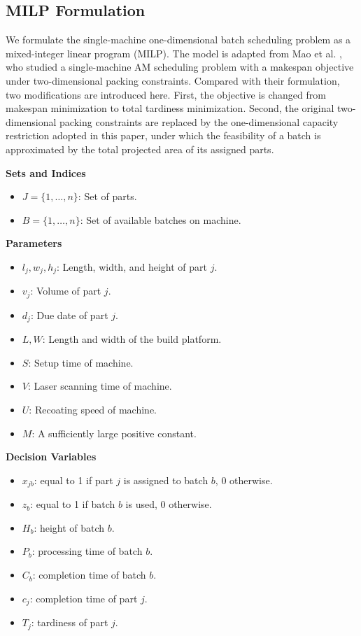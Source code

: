 \documentclass[letterpaper, 10 pt, conference]{ieeeconf}  %
\begin{document}
\subsection{MILP Formulation}
We formulate the single-machine one-dimensional batch scheduling problem as a mixed-integer linear program (MILP). The model is adapted from Mao et al. \cite{maoCombinatorialBendersDecomposition2024}, who studied a single-machine AM scheduling problem with a makespan objective under two-dimensional packing constraints. Compared with their formulation, two modifications are introduced here. First, the objective is changed from makespan minimization to total tardiness minimization. Second, the original two-dimensional packing constraints are replaced by the one-dimensional capacity restriction adopted in this paper, under which the feasibility of a batch is approximated by the total projected area of its assigned parts. 

\noindent \textbf{Sets and Indices}
\begin{itemize}
    \item $J = \{1, \dots, n\}$: Set of parts.
    \item $B = \{1, \dots, n\}$: Set of available batches on machine.
\end{itemize}

\noindent \textbf{Parameters}
\begin{itemize}
    \item $l_j, w_j, h_j$: Length, width, and height of part $j$.
    \item $v_j$: Volume of part $j$.
    \item $d_j$: Due date of part $j$.
    \item $L, W$: Length and width of the build platform.
    \item $S$: Setup time of machine.
    \item $V$: Laser scanning time of machine.
    \item $U$: Recoating speed of machine.
    \item $M$: A sufficiently large positive constant.
\end{itemize}

\noindent \textbf{Decision Variables}
\begin{itemize}
    \item $x_{jb}$:  equal to 1 if part $j$ is assigned to batch $b$, 0 otherwise.
    \item $z_b$: equal to 1 if batch $b$ is used, 0 otherwise.
    \item $H_b$: height of batch $b$.
    \item $P_b$: processing time of batch $b$.
    \item $C_b$: completion time of batch $b$.
    \item $c_j$: completion time of part $j$.
    \item $T_j$: tardiness of part $j$.
\end{itemize}
\end{document}
